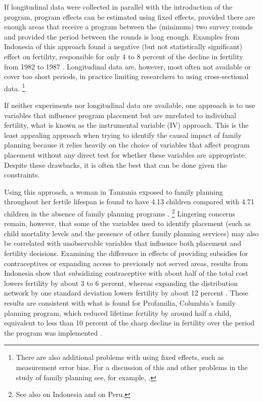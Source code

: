 \documentclass[letterpaper,12pt]{article}
\begin{document}
If longitudinal data were collected in parallel with the introduction of
the program, program effects can be estimated using fixed effects,
provided there are enough areas that receive a program between the
(minimum) two survey rounds and provided the period between the rounds
is long enough.
Examples from Indonesia of this approach found a negative (but not
statistically significant) effect on fertility, responsible for only 4
to 8 percent of the decline in fertility from 1982 to 1987
\citep{pitt93,Gertler1994}.
Longitudinal data are, however, most often not available or cover too
short periods, in practice limiting researchers to using cross-sectional
data.%
\footnote{
There are also additional problems with using fixed effects, such as
measurement error bias.
For a discussion of this and other problems in the study of family
planning see, for example, \cite{angeles98}.}

If neither experiments nor longitudinal data are available, one approach
is to use variables that influence program placement but are unrelated
to individual fertility, what is known as the instrumental variable (IV)
approach.
This is the least appealing approach when trying to identify the causal
impact of family planning because it relies heavily on the choice of
variables that affect program placement without any direct test for
whether these variables are appropriate.
Despite these drawbacks, it is often the best that can be done given the
constraints.

Using this approach, a woman in Tanzania exposed to family planning
throughout her fertile lifespan is found to have 4.13 children compared
with 4.71 children in the absence of family planning programs
\citep{angeles98}.%
\footnote{
See also \citet{Angeles2005} on Indonesia and \citep{Angeles2005a} on
Peru.}
Lingering concerns remain, however, that some of the variables used to
identify placement (such as child mortality levels and the presence of
other family planning services) may also be correlated with unobservable
variables that influence both placement and fertility decisions.
Examining the difference in effects of providing subsidies for
contraceptives or expanding access to previously not served areas,
results from Indonesia show that subsidizing contraceptive with
about half of the total cost lowers fertility by about 3 to 6 percent, 
whereas expanding the distribution network by
one standard deviation lowers fertility by about 12 percent
\citep{Molyneaux2000}.
These results are consistent with what is found for Profamilia,
Columbia's family planning program, which reduced lifetime fertility by
around half a child, equivalent to less than 10 percent of the sharp
decline in fertility over the period the program was implemented
\citep{Miller2010}.
\end{document}
